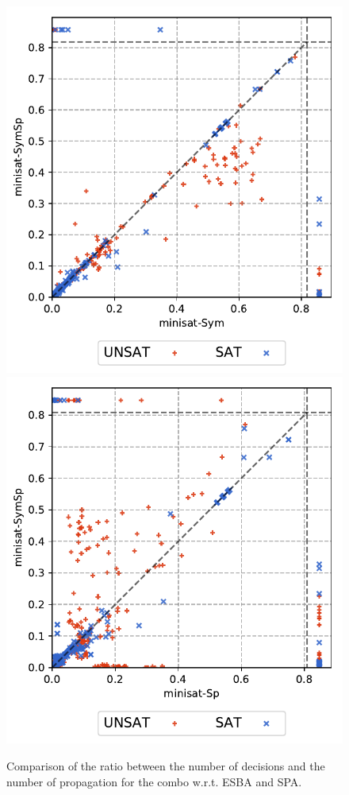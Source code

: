 \begin{center}
\begin{figure}[!htbp]
 \includegraphics[scale=0.5]{img/full-INFGB-ratio-vscosy.pdf}
 \includegraphics[scale=0.5]{img/full-INFGB-ratio-vsspfs.pdf}
 \caption{Comparison of the ratio between the number of decisions and the number of propagation for the combo w.r.t. ESBA and SPA.}
 \label{fig:ratio}
\end{figure}
\end{center}

